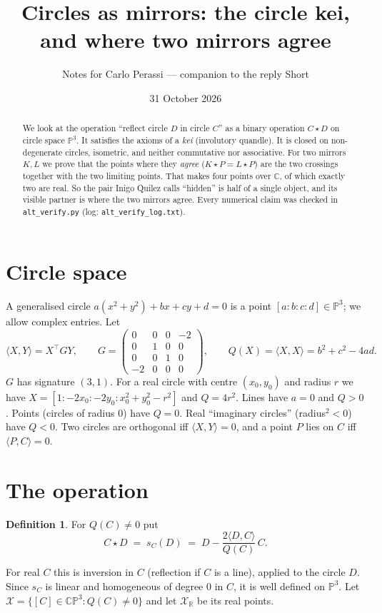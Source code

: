 \documentclass[10pt]{article}
\title{Circles as mirrors: the circle kei, and where two mirrors agree}
\author{Notes for Carlo Perassi --- companion to the reply Short}
\date{31 October 2026}
\theoremstyle{definition}\newtheorem{definition}[theorem]{Definition}\newtheorem{remark}[theorem]{Remark}
\newcommand{\ip}[2]{\langle #1,#2\rangle}
\begin{document}
\maketitle
\begin{abstract}
We look at the operation ``reflect circle $D$ in circle $C$'' as a binary operation $C\star D$ on circle space $\mathbb P^3$.
It satisfies the axioms of a \emph{kei} (involutory quandle). It is closed on non-degenerate circles, isometric, and neither commutative nor associative.
For two mirrors $K,L$ we prove that the points where they \emph{agree} ($K\star P=L\star P$) are the two crossings together with the two limiting points. That makes four points over $\mathbb C$, of which exactly two are real.
So the pair Inigo Quilez calls ``hidden'' is half of a single object, and its visible partner is where the two mirrors agree.
Every numerical claim was checked in \texttt{alt\_verify.py} (log: \texttt{alt\_verify\_log.txt}).
\end{abstract}

\section{Circle space}
A generalised circle $a(x^2+y^2)+bx+cy+d=0$ is a point $[a:b:c:d]\in\mathbb P^3$; we allow complex entries.
Let
\[\ip XY = X^{\!\top}GY,\qquad G=\begin{pmatrix}0&0&0&-2\\0&1&0&0\\0&0&1&0\\-2&0&0&0\end{pmatrix},\qquad Q(X)=\ip XX=b^2+c^2-4ad .\]
$G$ has signature $(3,1)$.
For a real circle with centre $(x_0,y_0)$ and radius $r$ we have $X=[1:-2x_0:-2y_0:x_0^2+y_0^2-r^2]$ and $Q=4r^2$.
Lines have $a=0$ and $Q>0$. Points (circles of radius $0$) have $Q=0$. Real ``imaginary circles'' (radius$^2<0$) have $Q<0$.
Two circles are orthogonal iff $\ip XY=0$, and a point $P$ lies on $C$ iff $\ip PC=0$.

\section{The operation}
\begin{definition} For $Q(C)\neq 0$ put
\[ C\star D \;=\; s_C(D) \;=\; D-\frac{2\ip DC}{Q(C)}\,C .\]
\end{definition}
For real $C$ this is inversion in $C$ (reflection if $C$ is a line), applied to the circle $D$.
Since $s_C$ is linear and homogeneous of degree $0$ in $C$, it is well defined on $\mathbb P^3$.
Let $\mathcal X=\{[C]\in\mathbb{CP}^3: Q(C)\neq0\}$ and let $\mathcal X_{\mathbb R}$ be its real points.
\end{document}
